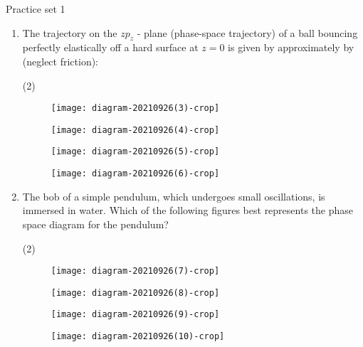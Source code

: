 \newpage
\begin{abox}
	Practice set 1 
	\end{abox}
\begin{enumerate}
	\item The trajectory on the $z p_{z}$ - plane (phase-space trajectory) of a ball bouncing perfectly elastically off a hard surface at $z=0$ is given by approximately by (neglect friction):
	{}
\begin{tasks}(2)
	\task[\textbf{A.}]\begin{figure}[H]
		\centering
		\texttt{[image: diagram-20210926(3)-crop]}
	\end{figure}
	\task[\textbf{B.}]\begin{figure}[H]
		\centering
		\texttt{[image: diagram-20210926(4)-crop]}
	\end{figure}
	\task[\textbf{C.}]\begin{figure}[H]
		\centering
		\texttt{[image: diagram-20210926(5)-crop]}
	\end{figure}
	\task[\textbf{D.}]\begin{figure}[H]
		\centering
		\texttt{[image: diagram-20210926(6)-crop]}
	\end{figure}
\end{tasks}
	\item The bob of a simple pendulum, which undergoes small oscillations, is immersed in water. Which of the following figures best represents the phase space diagram for the pendulum?
	{}
\begin{tasks}(2)
	\task[\textbf{A.}]\begin{figure}[H]
		\centering
		\texttt{[image: diagram-20210926(7)-crop]}
	\end{figure}
	\task[\textbf{B.}]\begin{figure}[H]
		\centering
		\texttt{[image: diagram-20210926(8)-crop]}
	\end{figure}
	\task[\textbf{C.}]\begin{figure}[H]
		\centering
		\texttt{[image: diagram-20210926(9)-crop]}
	\end{figure}
	\task[\textbf{D.}]\begin{figure}[H]
		\centering
		\texttt{[image: diagram-20210926(10)-crop]}
	\end{figure}
\end{tasks}

\end{enumerate}
